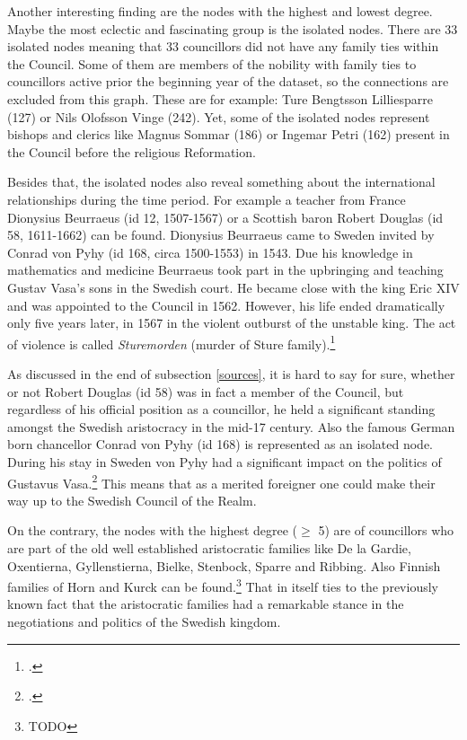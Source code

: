 Another interesting finding are the nodes with the highest and lowest degree. Maybe the most eclectic and fascinating group is the isolated nodes. There are 33 isolated nodes meaning that 33 councillors did not have any family ties within the Council. Some of them are members of the nobility with family ties to councillors active prior the beginning year of the dataset, so the connections are excluded from this graph. These are for example: Ture Bengtsson Lilliesparre (127) or Nils Olofsson Vinge (242). Yet, some of the isolated nodes represent bishops and clerics like Magnus Sommar (186) or Ingemar Petri (162) present in the Council before the religious Reformation. 

Besides that, the isolated nodes also reveal something about the international relationships during the time period. For example a teacher from France Dionysius Beurraeus (id 12, 1507-1567) or a Scottish baron Robert Douglas (id 58, 1611-1662) can be found. Dionysius Beurraeus came to Sweden invited by Conrad von Pyhy (id 168, circa 1500-1553) in 1543. Due his knowledge in mathematics and medicine Beurraeus took part in the upbringing and teaching Gustav Vasa's sons in the Swedish court. He became close with the king Eric XIV and was appointed to the Council in 1562. However, his life ended dramatically only five years later, in 1567 in the violent outburst of the unstable king. The act of violence is called \textit{Sturemorden} (murder of Sture family).\footcite{sbl_DB}   

As discussed in the end of subsection \ref{sources}, it is hard to say for sure, whether or not Robert Douglas (id 58) was in fact a member of the Council, but regardless of his official position as a councillor, he held a significant standing amongst the Swedish aristocracy in the mid-17 century. Also the famous German born chancellor Conrad von Pyhy (id 168) is represented as an isolated node. During his stay in Sweden von Pyhy had a significant impact on the politics of Gustavus Vasa.\footcite[pp. 81-83.]{pSuurvalta} This means that as a merited foreigner one could make their way up to the Swedish Council of the Realm.

On the contrary, the nodes with the highest degree ($\geq$ 5) are of councillors who are part of the old well established aristocratic families like De la Gardie, Oxentierna, Gyllenstierna, Bielke, Stenbock, Sparre and Ribbing. Also Finnish families of Horn and Kurck can be found.\footnote{TODO} That in itself ties to the previously known fact that the aristocratic families had a remarkable stance in the negotiations and politics of the Swedish kingdom.

